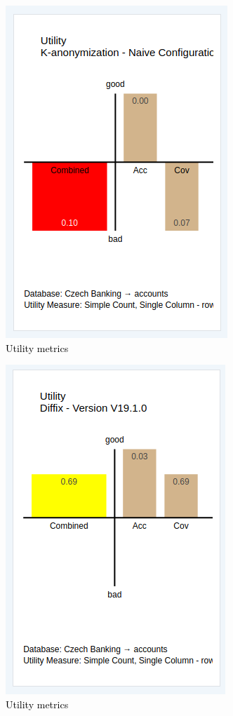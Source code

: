 \documentclass{fancyslides}
\begin{document}

\begin{frame}
\begin{center}
\includegraphics[width=0.5\linewidth]{util02.png} \\
\textcolor{black}{Utility metrics}
\end{center}
\end{frame}


\begin{frame}
\begin{center}
\includegraphics[width=0.5\linewidth]{util03.png} \\
\textcolor{black}{Utility metrics}
\end{center}
\end{frame}
\end{document}
